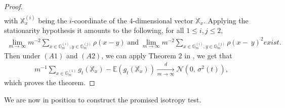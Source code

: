 \documentclass[12pt]{article}
\theoremstyle{Theorem}
\theoremstyle{definition}
\begin{document}
\begin{proof}
\begin{align*}
\end{align*} 
with $\mathbb{X}^{(i)}_{x}$ being the $i$-coordinate of the $4$-dimensional vector $\mathbb{X}_{x}$. Applying the stationarity hypothesis it amounts to the following, for all $1 \leq i,j \leq 2$,
\begin{align*}
\lim_{m \to \infty} m^{-2}\sum_{x \in \mathbb{G}^{\scriptscriptstyle (i)}_{m}, y \in \mathbb{G}^{\scriptscriptstyle (j)}_{m} }\rho(x-y)  \;  \text{and} \; \lim_{m \to \infty} m^{-2}\sum_{x \in \mathbb{G}^{\scriptscriptstyle (i)}_{m}, y \in \mathbb{G}^{\scriptscriptstyle (j)}_{m} }\rho(x-~y)^{2} exist.
\end{align*} 
Then under $(A1)$ and $(A2)$, we can apply Theorem $2$ in \cite{arcones}, we get that 
\begin{align*}
m^{-1} \sum_{x \in \mathbb{G}^{\scriptscriptstyle (1)}_{m}} g_{\scriptscriptstyle t}\left(\mathbb{X}_{x}\right) - \mathbb{E}\left(g_{\scriptscriptstyle t}\left(\mathbb{X}_{x}\right)\right) \xrightarrow[m \to \infty]{d} \mathcal{N}\left(0,\,\sigma^{2}(t)\right),
\end{align*}
which proves the theorem.
\end{proof}
We are now in position to construct the promised isotropy test.
\end{document}
